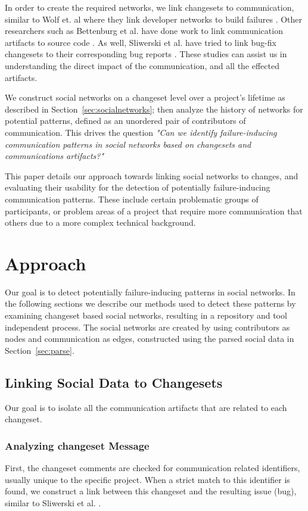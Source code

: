 \documentclass[conference]{IEEEtran}
\begin{document}
In order to create the required networks, we link changesets to communication, similar to Wolf et. al where they link developer networks to build failures \cite{4721184}.  Other researchers such as Bettenburg et al. have done work to link communication artifacts to source code \cite{Bettenburg:2008:ESI:1370750.1370757}.  As well, Sliwerski et al. have tried to link bug-fix changesets to their corresponding bug reports \cite{Sliwerski:2005:CIF:1083142.1083147}.  These studies can assist us in understanding the direct impact of the communication, and all the effected artifacts.  

We construct social networks on a changeset level over a project's lifetime as described in Section~\ref{sec:socialnetworks}; then analyze the history of networks for potential patterns, defined as an unordered pair of contributors of communication.  This drives the question \textit{"Can we identify failure-inducing communication patterns in social networks based on changesets and communications artifacts?"} 

This paper details our approach towards linking social networks to changes, and evaluating their usability for the detection of potentially failure-inducing communication patterns. These include certain problematic groups of participants, or problem areas of a project that require more communication that others due to a more complex technical background.

\section{Approach}
Our goal is to detect potentially failure-inducing patterns in social networks.  In the following sections we describe our methods used to detect these patterns by examining changeset based social networks, resulting in a repository and tool independent process.  The social networks are created by using contributors as nodes and communication as edges, constructed using the parsed social data in  Section~\ref{sec:parse}.

\subsection{Linking Social Data to Changesets}
Our goal is to isolate all the communication artifacts that are related to each changeset.  
\subsubsection{Analyzing changeset Message}
First, the changeset comments are checked for communication related identiﬁers, usually unique to the specific project. When a strict match to this identifier is found, we construct a link between this changeset and the resulting issue (bug), similar to Sliwerski et al. \cite{Sliwerski:2005:CIF:1083142.1083147}.
\end{document}

